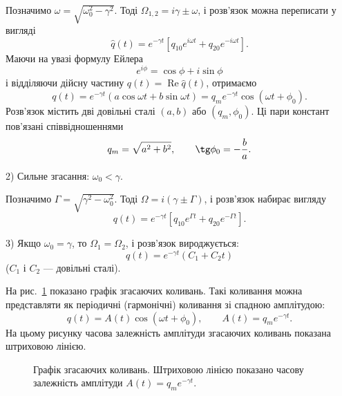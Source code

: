 Позначимо $\omega = \sqrt{\omega_0^2 - \gamma^2}$. Тоді $\Omega_{1,2} = i\gamma \pm
\omega$, і розв'язок можна переписати у вигляді
\begin{equation}\label{eq:weak_damping_complex}
	\hat{q}(t) = e^{-\gamma t}\left[q_{10} e^{i\omega t} + q_{20} e^{-i\omega t}\right].
\end{equation}
Маючи на увазі формулу Ейлера
\begin{equation}\label{eq:Euler}
	e^{i\phi} = \cos\phi + i\sin\phi
\end{equation}
і відділяючи дійсну частину $q(t) = \operatorname{Re}\hat{q}(t)$, отримаємо
\begin{equation}\label{eq:weak_damping}
	q(t) = e^{-\gamma t}\left(a\cos\omega t + b\sin\omega t\right) = q_m e^{-\gamma t}\cos(\omega t + \phi_0).
\end{equation}
Розв'язок містить дві довільні сталі $(a, b)$ або $(q_m, \phi_0)$.
Ці пари констант пов'язані співвідношеннями
\begin{equation}\label{eq:constants_relation}
	q_m = \sqrt{a^2 + b^2}, \qquad \tg\phi_0 = -\frac{b}{a}.
\end{equation}

2) Сильне згасання: $\omega_0 < \gamma$.

Позначимо $\Gamma = \sqrt{\gamma^2 - \omega_0^2}$. Тоді $\Omega = i(\gamma \pm \Gamma)$, і розв'язок набирає вигляду
\begin{equation}\label{eq:strong_damping}
	q(t) = e^{-\gamma t}\left[q_{10} e^{\Gamma t} + q_{20} e^{-\Gamma t}\right].
\end{equation}

3) Якщо $\omega_0 = \gamma$, то $\Omega_1 = \Omega_2$, і розв'язок вироджується:
\begin{equation}\label{eq:critical_damping}
	q(t) = e^{-\gamma t}\left(C_1 + C_2 t\right)
\end{equation}
($C_1$ і $C_2$ --- довільні сталі).

На рис.~\ref{tikz:damped} показано графік згасаючих коливань. Такі коливання можна представляти як періодичні (гармонічні) коливання зі спадною амплітудою:
\begin{equation}\label{eq:damped_general}
	q(t) = A(t)\cos(\omega t + \phi_0), \qquad A(t) = q_m e^{-\gamma t}.
\end{equation}
На цьому рисунку часова залежність амплітуди згасаючих коливань показана штриховою лінією.

\begin{figure}[h!]
	\centering
	\caption{Графік згасаючих коливань. Штриховою лінією показано часову залежність амплітуди $A(t) = q_m e^{-\gamma t}$.}
	\label{tikz:damped}
\end{figure}

